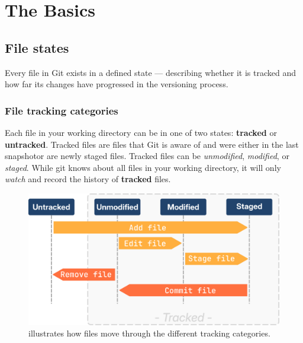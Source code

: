 \chapter{The Basics}
\chapteroverlay
\section{File states}
Every file in Git exists in a defined state — describing whether it is tracked and how far its changes have progressed in the versioning process.

\subsection{File tracking categories}
Each file in your working directory can be in one of two states: \textbf{tracked} or \textbf{untracked}. Tracked files are files that Git is aware of and were either in the last snapshot\footnotemark[1] or are newly staged files.
Tracked files can be \textit{unmodified}, \textit{modified}, or \textit{staged}. \newline
While git knows about all files in your working directory, it will only \textit{watch} and record the history of \textbf{tracked} files.

\begin{figure}[H]
\centering
    \includegraphics[scale=1]{Images/workingTree_tracked.png}
    \caption{illustrates how files move through the different tracking categories.}
\end{figure}

